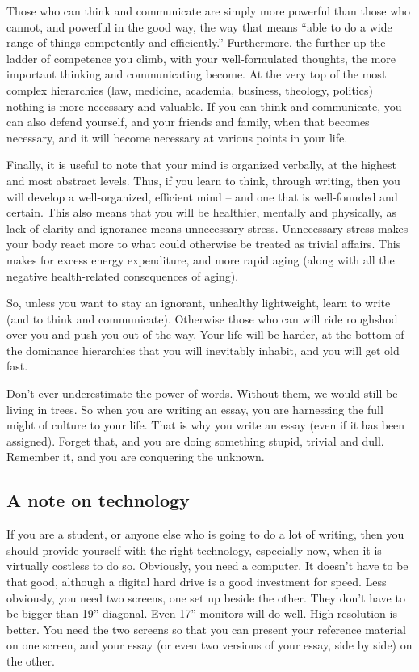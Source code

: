 \documentclass{article}
\begin{document}
Those who can think and communicate are simply more powerful than those
who cannot, and powerful in the good way, the way that means ``able to
do a wide range of things competently and efficiently.'' Furthermore,
the further up the ladder of competence you climb, with your
well-formulated thoughts, the more important thinking and communicating
become. At the very top of the most complex hierarchies (law, medicine,
academia, business, theology, politics) nothing is more necessary and
valuable. If you can think and communicate, you can also defend
yourself, and your friends and family, when that becomes necessary, and
it will become necessary at various points in your life.

Finally, it is useful to note that your mind is organized verbally, at
the highest and most abstract levels. Thus, if you learn to think,
through writing, then you will develop a well-organized, efficient mind
-- and one that is well-founded and certain. This also means that you
will be healthier, mentally and physically, as lack of clarity and
ignorance means unnecessary stress. Unnecessary stress makes your body
react more to what could otherwise be treated as trivial affairs. This
makes for excess energy expenditure, and more rapid aging (along with
all the negative health-related consequences of aging).

So, unless you want to stay an ignorant, unhealthy lightweight, learn to
write (and to think and communicate). Otherwise those who can will ride
roughshod over you and push you out of the way. Your life will be
harder, at the bottom of the dominance hierarchies that you will
inevitably inhabit, and you will get old fast.

Don't ever underestimate the power of words. Without them, we would
still be living in trees. So when you are writing an essay, you are
harnessing the full might of culture to your life. That is why you write
an essay (even if it has been assigned). Forget that, and you are doing
something stupid, trivial and dull. Remember it, and you are conquering
the unknown.

\subsection{A note on technology}

If you are a student, or anyone else who is going to do a lot of
writing, then you should provide yourself with the right technology,
especially now, when it is virtually costless to do so. Obviously, you
need a computer. It doesn't have to be that good, although a digital
hard drive is a good investment for speed. Less obviously, you need two
screens, one set up beside the other. They don't have to be bigger than
19'' diagonal. Even 17'' monitors will do well. High resolution is
better. You need the two screens so that you can present your reference
material on one screen, and your essay (or even two versions of your
essay, side by side) on the other.
\end{document}
